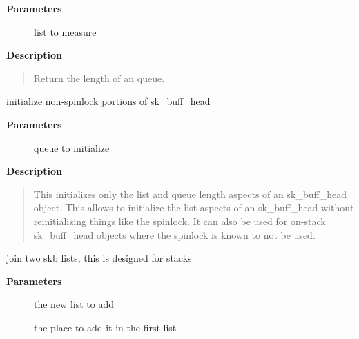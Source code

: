 \documentclass[a4paper,8pt,english]{sphinxmanual}
\begin{document}
\textbf{Parameters}
\begin{description}
\item[{}] \leavevmode
list to measure

\end{description}

\textbf{Description}
\begin{quote}

Return the length of an {\hyperref[networking/kapi:c.sk_buff]{\emph{}}} queue.
\end{quote}

\begin{fulllineitems}
\label{networking/kapi:c.__skb_queue_head_init}
initialize non-spinlock portions of sk\_buff\_head

\end{fulllineitems}


\textbf{Parameters}
\begin{description}
\item[{}] \leavevmode
queue to initialize

\end{description}

\textbf{Description}
\begin{quote}

This initializes only the list and queue length aspects of
an sk\_buff\_head object.  This allows to initialize the list
aspects of an sk\_buff\_head without reinitializing things like
the spinlock.  It can also be used for on-stack sk\_buff\_head
objects where the spinlock is known to not be used.
\end{quote}

\begin{fulllineitems}
\label{networking/kapi:c.skb_queue_splice}
join two skb lists, this is designed for stacks

\end{fulllineitems}


\textbf{Parameters}
\begin{description}
\item[{}] \leavevmode
the new list to add

\item[{}] \leavevmode
the place to add it in the first list

\end{description}
\end{document}
